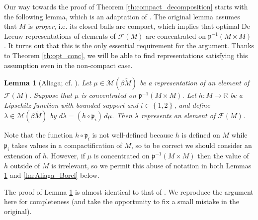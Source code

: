 \documentclass[a4paper,10pt]{amsart}
\newcommand{\RR}{\mathbb{R}}                                %
\newcommand{\set}[1]{\left\{{#1}\right\}}                   %
\newcommand{\lipfree}[1]{\mathcal{F}({#1})}                 %
\newcommand{\meas}[1]{\mathcal{M}({#1})}                    %
\newcommand{\wt}[1]{\widetilde{#1}}                         %
\newcommand{\bwt}[1]{\beta\wt{#1}}                          %
\newcommand{\pp}{\mathfrak{p}}                              %
\theoremstyle{plain}
\newtheorem{lemma}[theorem]{Lemma}
\theoremstyle{definition}
\theoremstyle{remark}
\begin{document}
Our way towards the proof of Theorem \ref{th:compact_decomposition} starts with the following lemma, which is an adaptation of \cite[Lemma 11]{Aliaga}. The original lemma assumes that $M$ is \emph{proper}, i.e. its closed balls are compact, which implies that optimal De Leeuw representations of elements of $\lipfree{M}$ are concentrated on $\pp^{-1}(M\times M)$ \cite[Proposition 7]{Aliaga}. It turns out that this is the only essential requirement for the argument. Thanks to Theorem \ref{th:opt_conc}, we will be able to find representations satisfying this assumption even in the non-compact case.

\begin{lemma}[Aliaga; cf. {\cite[Lemma 11]{Aliaga}}]\label{lm:Aliaga_variant}
Let $\mu\in \meas{\bwt{M}}$ be a representation of an element of $\lipfree{M}$. Suppose that $\mu$ is concentrated on $\pp^{-1}(M \times M)$. Let $h:M\to\RR$ be a Lipschitz function with bounded support and $i\in\set{1,2}$, and define $\lambda\in\meas{\bwt{M}}$ by $d\lambda = (h\circ\pp_i)\,d\mu$. Then $\lambda$ represents an element of $\lipfree{M}$.
\end{lemma}

Note that the function $h\circ\pp_i$ is not well-defined because $h$ is defined on $M$ while $\pp_i$ takes values in a compactification of $M$, so to be correct we should consider an extension of $h$. However, if $\mu$ is concentrated on $\pp^{-1}(M\times M)$ then the value of $h$ outside of $M$ is irrelevant, so we permit this abuse of notation in both Lemmas \ref{lm:Aliaga_variant} and \ref{lm:Aliaga_Borel} below.

The proof of Lemma \ref{lm:Aliaga_variant} is almost identical to that of \cite[Lemma 11]{Aliaga}. We reproduce the argument here for completeness (and take the opportunity to fix a small mistake in the original).
\end{document}
